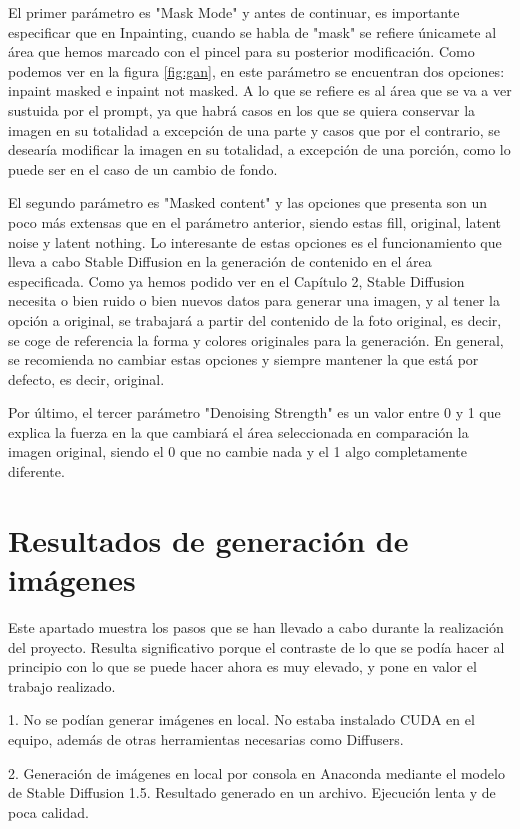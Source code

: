 El primer parámetro es "Mask Mode" y antes de continuar, es importante especificar que en Inpainting, cuando se habla de "mask" se refiere únicamete al área que hemos marcado con el pincel para su posterior modificación. Como podemos ver en la figura \ref{fig:gan}, en este parámetro se encuentran dos opciones: inpaint masked e inpaint not masked. A lo que se refiere es al área que se va a ver sustuida por el prompt, ya que habrá casos en los que se quiera conservar la imagen en su totalidad a excepción de una parte y casos que por el contrario, se desearía modificar la imagen en su totalidad, a excepción de una porción, como lo puede ser en el caso de un cambio de fondo. 

El segundo parámetro es "Masked content" y las opciones que presenta son un poco más extensas que en el parámetro anterior, siendo estas fill, original, latent noise y latent nothing. Lo interesante de estas opciones es el funcionamiento que lleva a cabo Stable Diffusion en la generación de contenido en el área especificada. Como ya hemos podido ver en el Capítulo 2, Stable Diffusion necesita o bien ruido o bien nuevos datos para generar una imagen, y al tener la opción a original, se trabajará a partir del contenido de la foto original, es decir, se coge de referencia la forma y colores originales para la generación. En general, se recomienda no cambiar estas opciones y siempre mantener la que está por defecto, es decir, original. 

Por último, el tercer parámetro "Denoising Strength" es un valor entre 0 y 1 que explica la fuerza en la que cambiará el área seleccionada en comparación la imagen original, siendo el 0 que no cambie nada y el 1 algo completamente diferente. 

\section{Resultados de generación de imágenes}

Este apartado muestra los pasos que se han llevado a cabo durante la realización del proyecto. Resulta significativo porque el contraste de lo que se podía hacer al principio con lo que se puede hacer ahora es muy elevado, y pone en valor el trabajo realizado.

1. No se podían generar imágenes en local. No estaba instalado CUDA en el equipo, además de otras herramientas necesarias como Diffusers.

2. Generación de imágenes en local por consola en Anaconda mediante el modelo de Stable Diffusion 1.5. Resultado generado en un archivo. Ejecución lenta y de poca calidad.

